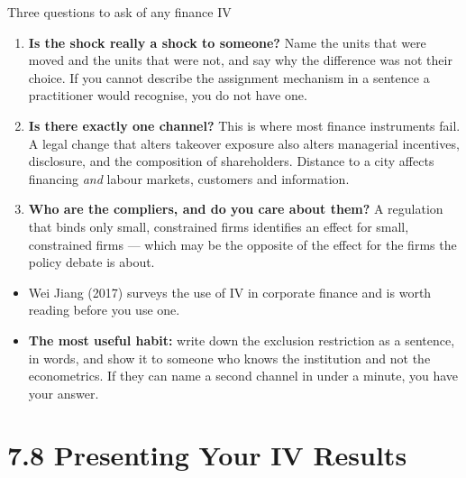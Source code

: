 \documentclass[
  11pt,
  ignorenonframetext,
  aspectratio=169,
]{beamer}
\providecommand{\tightlist}{%
  \setlength{\itemsep}{0pt}\setlength{\parskip}{0pt}}
\begin{document}
\begin{frame}{Three questions to ask of any finance IV}
\protect{}\label{three-questions-to-ask-of-any-finance-iv}
\begin{enumerate}
\tightlist
\item
  \textbf{Is the shock really a shock to someone?} Name the units that
  were moved and the units that were not, and say why the difference was
  not their choice. If you cannot describe the assignment mechanism in a
  sentence a practitioner would recognise, you do not have one.
\item
  \textbf{Is there exactly one channel?} This is where most finance
  instruments fail. A legal change that alters takeover exposure also
  alters managerial incentives, disclosure, and the composition of
  shareholders. Distance to a city affects financing \emph{and} labour
  markets, customers and information.
\item
  \textbf{Who are the compliers, and do you care about them?} A
  regulation that binds only small, constrained firms identifies an
  effect for small, constrained firms --- which may be the opposite of
  the effect for the firms the policy debate is about.
\end{enumerate}

\vspace{0.4em}

\begin{itemize}
\tightlist
\item
  Wei Jiang (2017) surveys the use of IV in corporate finance and is
  worth reading before you use one.
\item
  \textbf{The most useful habit:} write down the exclusion restriction
  as a sentence, in words, and show it to someone who knows the
  institution and not the econometrics. If they can name a second
  channel in under a minute, you have your answer.
\end{itemize}
\end{frame}

\section{7.8 Presenting Your IV
Results}\label{presenting-your-iv-results}
\end{document}

